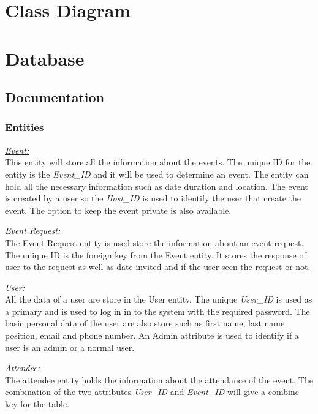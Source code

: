 \documentclass[a4paper]{article}
\begin{document}
\section{Class Diagram}

\section{Database}
\subsection{Documentation}
\subsubsection{Entities}
\underline{\textit{Event:}} \\
This entity will store all the information about the events. The unique ID for the entity is the \textit{Event\_ID} and it will be used to determine an event. The entity can hold all the necessary information such as date duration and location. The event is created by a user so the \textit{Host\_ID} is used to identify the user that create the event. The option to keep the event private is also available. 

\underline{\textit{Event Request:}} \\
The Event Request entity is used store the information about an event request. The unique ID is the foreign key from the Event entity. It stores the response of user to the request as well as date invited and if the user seen the request or not. 

\underline{\textit{User:}} \\
All the data of a user are store in the User entity. The unique \textit{User\_ID} is used as a primary and is used to log in in to the system with the required password. The basic personal data of the user are also store such as first name, last name, position, email and phone number. An Admin attribute is used to identify if a user is an admin or a normal user. 

\underline{\textit{Attendee:}} \\
The attendee entity holds the information about the attendance of the event. The combination of the two attributes \textit{User\_ID} and \textit{Event\_ID} will give a combine key for the table. 
\end{document}
